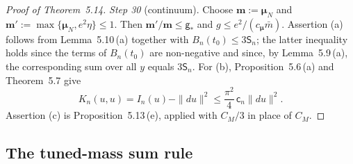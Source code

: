 \documentclass[11pt]{amsart}
\theoremstyle{definition}
\begin{document}
\begin{proof}[Proof of Theorem~5.14]
\emph{Step 30} (continuum).
Choose $\mathbf m:=\boldsymbol\mu_N$ and $\mathbf m':=\max\{\boldsymbol\mu_N,e^2\eta\}\le1$.
Then $\mathbf m'/\mathbf m\le\mathsf g_*$ and $g\le e^2/(c_{\boldsymbol\mu}\bar m)$.
Assertion (a) follows from Lemma~5.10\,(a) together with $B_n(t_0)\le3\mathsf S_n$; the latter inequality holds since the terms of $B_n(t_0)$ are non-negative and since, by Lemma~5.9\,(a), the corresponding sum over all $y$ equals $3\mathsf S_n$.
For (b), Proposition~5.6\,(a) and Theorem~5.7 give
\begin{equation*}
K_n(u,u)=I_n(u)-\|du\|^2\le\frac{\pi^2}{4}\,\mathsf c_n\|du\|^2.
\end{equation*}
Assertion (c) is Proposition~5.13\,(e), applied with $C_M/3$ in place of $C_M$.
\end{proof}
\subsection{The tuned-mass sum rule}
\end{document}

